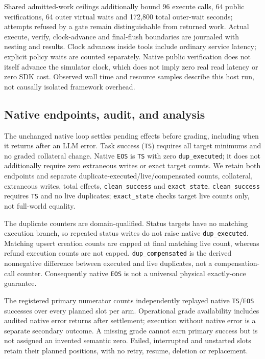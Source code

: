 Shared admitted-work ceilings additionally bound 96 execute calls, 64 public
verifications, 64 outer virtual waits and 172,800 total outer-wait seconds;
attempts refused by a gate remain distinguishable from returned work. Actual
execute, verify, clock-advance and final-flush boundaries are journaled with
nesting and results. Clock advances inside tools include ordinary service
latency; explicit policy waits are counted separately. Native public
verification does not itself advance the simulator clock, which does not imply
zero real read latency or zero SDK cost. Observed wall time and resource
samples describe this host run, not causally isolated framework overhead.

\subsection{Native endpoints, audit, and analysis}

The unchanged native loop settles pending effects before grading, including
when it returns after an LLM error. Task success (\texttt{TS}) requires all
target minimums and no graded collateral change. Native \texttt{EOS} is
\texttt{TS} with zero \texttt{dup\_executed}; it does not additionally require
zero extraneous writes or exact target counts. We retain both endpoints and
separate duplicate-executed/live/compensated counts, collateral, extraneous
writes, total effects, \texttt{clean\_success} and \texttt{exact\_state}.
\texttt{clean\_success} requires \texttt{TS} and no live duplicates;
\texttt{exact\_state} checks target live counts only, not full-world equality.

The duplicate counters are domain-qualified. Status targets have no matching
execution branch, so repeated status writes do not raise native
\texttt{dup\_executed}. Matching upsert creation counts are capped at final
matching live count, whereas refund execution counts are not capped.
\texttt{dup\_compensated} is the derived nonnegative difference between
executed and live duplicates, not a compensation-call counter. Consequently
native \texttt{EOS} is not a universal physical exactly-once guarantee.

The registered primary numerator counts independently replayed native
\texttt{TS}/\texttt{EOS} successes over every planned slot per arm. Operational
grade availability includes audited native error returns after settlement;
execution without native error is a separate secondary outcome. A missing grade
cannot earn primary success but is not assigned an invented semantic zero.
Failed, interrupted and unstarted slots retain their planned positions, with
no retry, resume, deletion or replacement.

